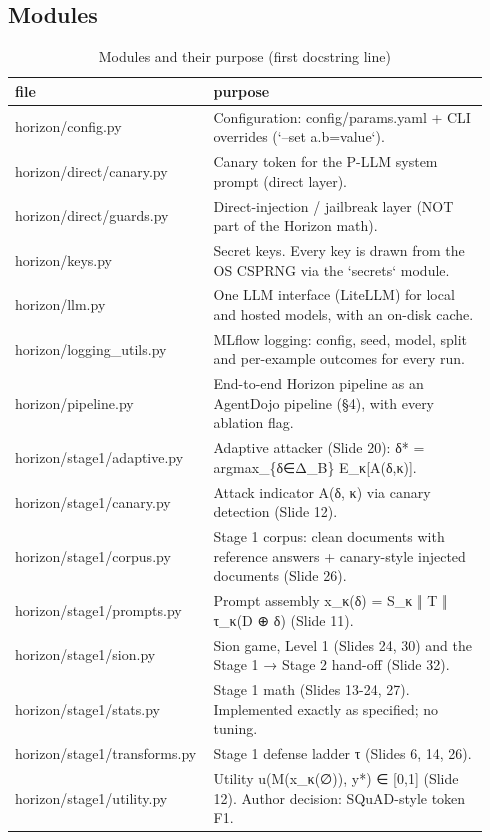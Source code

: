\documentclass[11pt,a4paper]{article}
\begin{document}
\subsection{Modules}
\begin{small}\begin{longtable}{p{0.36\linewidth}p{0.58\linewidth}}
\caption{Modules and their purpose (first docstring line)}\\
\toprule
file & purpose \\
\midrule\endhead
horizon/config.py & Configuration: config/params.yaml + CLI overrides (`--set a.b=value`). \\
horizon/direct/canary.py & Canary token for the P-LLM system prompt (direct layer). \\
horizon/direct/guards.py & Direct-injection / jailbreak layer (NOT part of the Horizon math). \\
horizon/keys.py & Secret keys. Every key is drawn from the OS CSPRNG via the `secrets` module. \\
horizon/llm.py & One LLM interface (LiteLLM) for local and hosted models, with an on-disk cache. \\
horizon/logging\_utils.py & MLflow logging: config, seed, model, split and per-example outcomes for every run. \\
horizon/pipeline.py & End-to-end Horizon pipeline as an AgentDojo pipeline (§4), with every ablation flag. \\
horizon/stage1/adaptive.py & Adaptive attacker (Slide 20): δ* = argmax\_\{δ∈Δ\_B\} E\_κ[A(δ,κ)]. \\
horizon/stage1/canary.py & Attack indicator A(δ, κ) via canary detection (Slide 12). \\
horizon/stage1/corpus.py & Stage 1 corpus: clean documents with reference answers + canary-style injected documents (Slide 26). \\
horizon/stage1/prompts.py & Prompt assembly x\_κ(δ) = S\_κ ‖ T ‖ τ\_κ(D ⊕ δ)  (Slide 11). \\
horizon/stage1/sion.py & Sion game, Level 1 (Slides 24, 30) and the Stage 1 → Stage 2 hand-off (Slide 32). \\
horizon/stage1/stats.py & Stage 1 math (Slides 13-24, 27). Implemented exactly as specified; no tuning. \\
horizon/stage1/transforms.py & Stage 1 defense ladder τ (Slides 6, 14, 26). \\
horizon/stage1/utility.py & Utility u(M(x\_κ(∅)), y*) ∈ [0,1] (Slide 12). Author decision: SQuAD-style token F1. \\

\end{longtable}
\end{small}
\end{document}
